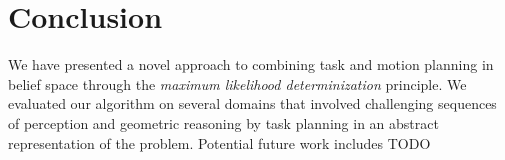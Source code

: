 \section{Conclusion}
We have presented a novel approach to combining task and motion planning
in belief space through the \emph{maximum likelihood determinization}
principle. We evaluated our algorithm on several domains that involved
challenging sequences of perception and geometric reasoning by task planning in
an abstract representation of the problem. Potential future work includes TODO